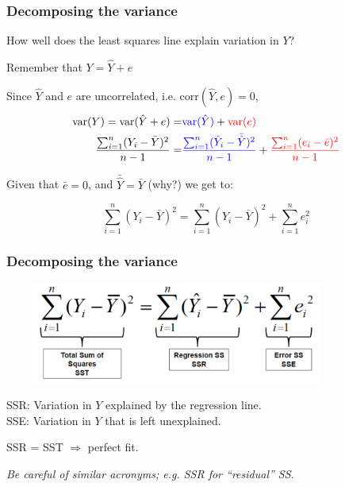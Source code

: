 \documentclass{beamer}
\newcommand{\rd}{\color{burntorange}}
\newcommand{\bk}{\color{black}}
\newcommand{\mr}[1]{\mathrm{#1}}
\newcommand{\sk}{\vspace{.5cm}}
\begin{document}
\begin{frame}
\frametitle{Decomposing the variance}
\rd {\bf Q:} How well does the least squares line explain variation in $Y$?
\bk

\sk
Remember that $Y = \hat{Y} + e $

\sk Since $\hat{Y}$ and $e$ are uncorrelated, i.e. $\mr{corr}(\hat{Y},
e) = 0$, 
\begin{equation*}
	\begin{split}
\mr{var}(Y) = \mr{var}(\hat{Y} + e) =& {\color{blue}\mr{var}(\hat{Y})} +
{\color{red}\mr{var}(e)} \\ 
\frac{\sum_{i=1}^n (Y_i - \bar{Y})^2}{n-1} =& {\color{blue}\frac{\sum_{i=1}^n (\hat{Y}_i - \bar{\hat{Y}})^2}{n-1}} + {\color{red}\frac{\sum_{i=1}^n (e_i-\bar{e})^2 }{n-1}} 		
	\end{split}
\end{equation*}


Given that $\bar{e} = 0$, and $\bar{\hat{Y}} = \bar{Y}$ (why?) we get to: 

\vspace{-2mm}
\sk
\begin{tcolorbox}
\[
\sum_{i=1}^n (Y_i - \bar{Y})^2 = 
\sum_{i=1}^n (\hat{Y}_i - \bar{Y})^2 + \sum_{i=1}^n e_i^2 
\]	
\end{tcolorbox}

\end{frame}

\begin{frame}
\frametitle{Decomposing the variance} 


~~~~
\hspace*{-4mm}\includegraphics[width=3.8in]{figures/anovaeqns}

\sk 
SSR: Variation in $Y$ explained by the regression line.\\
SSE: Variation in $Y$ that is left unexplained.

\sk\pause
\begin{center} \large
SSR = SST \rd $\Rightarrow$ \bk perfect fit.
\end{center}

\it Be careful of similar acronyms; e.g. SSR for ``residual'' SS.
\end{frame}
\end{document}
